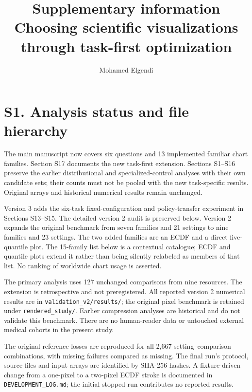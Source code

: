 \documentclass[10pt]{article}
\title{Supplementary information\\Choosing scientific visualizations through task-first optimization}
\author{Mohamed Elgendi}\date{}
\begin{document}
\maketitle
\section*{S1. Analysis status and file hierarchy}
The main manuscript now covers six questions and 13 implemented familiar chart families. Section S17 documents the new task-first extension. Sections S1--S16 preserve the earlier distributional and specialized-control analyses with their own candidate sets; their counts must not be pooled with the new task-specific results. Original arrays and historical numerical results remain unchanged.

Version 3 adds the six-task fixed-configuration and policy-transfer experiment in Sections S13--S15. The detailed version 2 audit is preserved below. Version 2 expands the original benchmark from seven families and 21 settings to nine families and 23 settings. The two added families are an ECDF and a direct five-quantile plot. The 15-family list below is a contextual catalogue; ECDF and quantile plots extend it rather than being silently relabeled as members of that list. No ranking of worldwide chart usage is asserted.

The primary analysis uses 127 unchanged comparisons from nine resources. The extension is retrospective and not preregistered. All reported version 2 numerical results are in \texttt{validation\_v2/results/}; the original pixel benchmark is retained under \texttt{rendered\_study/}. Earlier compression analyses are historical and do not validate this benchmark. There are no human-reader data or untouched external medical cohorts in the present study.

The original reference losses are reproduced for all 2,667 setting--comparison combinations, with missing failures compared as missing. The final run's protocol, source files and input arrays are identified by SHA-256 hashes. A fixture-driven change from a one-pixel to a two-pixel ECDF stroke is documented in \texttt{DEVELOPMENT\_LOG.md}; the initial stopped run contributes no reported results.
\end{document}
